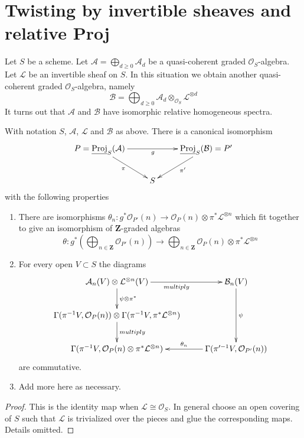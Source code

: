 \section{Twisting by invertible sheaves and relative Proj}
\label{section-twisting-and-proj}

\noindent
Let $S$ be a scheme.
Let $\mathcal{A} = \bigoplus_{d \geq 0} \mathcal{A}_d$ be a
quasi-coherent graded $\mathcal{O}_S$-algebra.
Let $\mathcal{L}$ be an invertible sheaf on $S$.
In this situation we obtain another quasi-coherent graded
$\mathcal{O}_S$-algebra, namely
$$
\mathcal{B}
=
\bigoplus\nolimits_{d \geq 0}
\mathcal{A}_d \otimes_{\mathcal{O}_S} \mathcal{L}^{\otimes d}
$$
It turns out that $\mathcal{A}$ and $\mathcal{B}$ have
isomorphic relative homogeneous spectra.

\begin{lemma}
\label{lemma-twisting-and-proj}
With notation $S$, $\mathcal{A}$, $\mathcal{L}$ and $\mathcal{B}$ as
above. There is a canonical isomorphism
$$
\xymatrix{
P = \underline{\text{Proj}}_S(\mathcal{A})
\ar[rr]_g \ar[rd]_\pi & &
\underline{\text{Proj}}_S(\mathcal{B}) = P'
\ar[ld]^{\pi'} \\
& S &
}
$$
with the following properties
\begin{enumerate}
\item There are isomorphisms
$\theta_n : g^*\mathcal{O}_{P'}(n)
\to
\mathcal{O}_P(n) \otimes \pi^*\mathcal{L}^{\otimes n}$
which fit together to give an isomorphism of $\mathbf{Z}$-graded
algebras
$$
\theta :
g^*\left(
\bigoplus\nolimits_{n \in \mathbf{Z}} \mathcal{O}_{P'}(n)
\right)
\longrightarrow
\bigoplus\nolimits_{n \in \mathbf{Z}} \mathcal{O}_P(n)
\otimes \pi^*\mathcal{L}^{\otimes n}
$$
\item For every open $V \subset S$ the diagrams
$$
\xymatrix{
\mathcal{A}_n(V) \otimes \mathcal{L}^{\otimes n}(V)
\ar[r]_{multiply} \ar[d]^{\psi \otimes \pi^*}
&
\mathcal{B}_n(V) \ar[dd]^\psi \\
\Gamma(\pi^{-1}V, \mathcal{O}_P(n)) \otimes
\Gamma(\pi^{-1}V, \pi^*\mathcal{L}^{\otimes n})
\ar[d]^{multiply} \\
\Gamma(\pi^{-1}V, \mathcal{O}_P(n) \otimes \pi^*\mathcal{L}^{\otimes n})
&
\Gamma(\pi'^{-1}V, \mathcal{O}_{P'}(n)) \ar[l]_-{\theta_n}
}
$$
are commutative.
\item Add more here as necessary.
\end{enumerate}
\end{lemma}

\begin{proof}
This is the identity map when $\mathcal{L} \cong \mathcal{O}_S$.
In general choose an open covering of $S$ such that $\mathcal{L}$
is trivialized over the pieces and glue the corresponding maps.
Details omitted.
\end{proof}
















